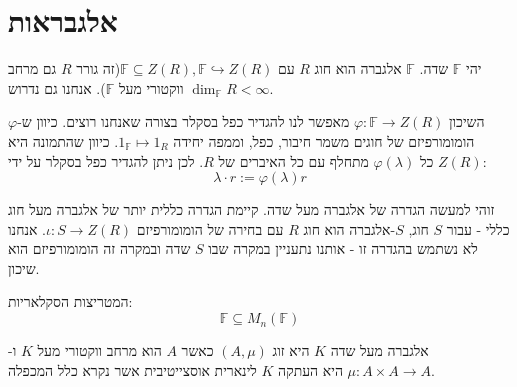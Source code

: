 \documentclass{tstextbook}
\begin{document}
\section{אלגבראות}

\begin{definition}[אלגברה]
יהי \(\mathbb{F}\) שדה. \(\mathbb{F}\) אלגברה הוא חוג \(R\) עם \(\mathbb{F} \subseteq Z(R), \mathbb{F} \hookrightarrow Z(R)\)(זה גורר \(R\) גם מרחב ווקטורי מעל \(\mathbb{F}\)). אנחנו גם נדרוש \(\dim_{\mathbb{F}}R<\infty\).

\end{definition}
\begin{remark}
השיכון \(\varphi : \mathbb{F} \to Z(R)\) מאפשר לנו להגדיר כפל בסקלר בצורה שאנחנו רוצים. כיוון ש-\(\varphi\) הומומורפיזם של חוגים משמר חיבור, כפל, וממפה יחידה \(1_{\mathbb{F}} \mapsto 1_R\). כיוון שהתמונה היא \(Z(R)\) כל \(\varphi(\lambda)\) מתחלף עם כל האיברים של \(R\). לכן ניתן להגדיר כפל בסקלר על ידי:
$$\lambda \cdot r := \varphi\left( \lambda \right)r$$

\end{remark}
\begin{remark}
זוהי למעשה הגדרה של אלגברה מעל שדה. קיימת הגדרה כללית יותר של אלגברה מעל חוג כללי - עבור \(S\) חוג, \(S\)-אלגברה הוא חוג \(R\) עם בחירה של הומומורפיזם \(\iota:S\to Z(R)\). אנחנו לא נשתמש בהגדרה זו - אותנו נתעניין במקרה שבו \(S\) שדה ובמקרה זה הומומורפיזם הוא שיכון.

\end{remark}
\begin{example}
המטריצות הסקלאריות:
$$\mathbb{F} \subseteq M_{n}(\mathbb{F} )$$

\end{example}
\begin{proposition}
אלגברה מעל שדה \(K\) היא זוג \(\left( A,\mu \right)\) כאשר \(A\) הוא מרחב ווקטורי מעל \(K\) ו-\(\mu:A\times A\to A\) היא העתקה \(K\) לינארית אוסצייטיבית אשר נקרא כלל המכפלה. 

\end{proposition}
\end{document}
